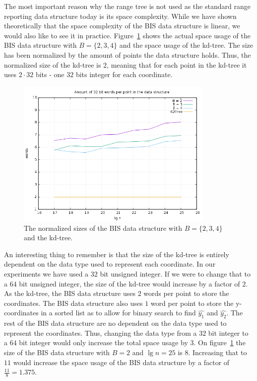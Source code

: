 The most important reason why the range tree is not used as the standard range reporting data structure today is its space complexity. While we have shown theoretically that the space complexity of the BIS data structure is linear, we would also like to see it in practice. Figure~\ref{fig:sizes} shows the actual space usage of the BIS data structure with $B=\{2,3,4\}$ and the space usage of the kd-tree. The size has been normalized by the amount of points the data structure holds. Thus, the normalized size of the kd-tree is $2$, meaning that for each point in the kd-tree it uses $2\cdot 32$ bits - one $32$ bits integer for each coordinate.

\begin{figure}[h]
    \centering
    \includegraphics[width = 0.85\textwidth]{pictures/analysis/sizes.png}
    \caption{The normalized sizes of the BIS data structure with $B=\{2,3,4\}$ and the kd-tree.}\label{fig:sizes}
\end{figure}
\clearpage


An interesting thing to remember is that the size of the kd-tree is entirely dependent on the data type used to represent each coordinate. In our experiments we have used a $32$ bit unsigned integer. If we were to change that to a $64$ bit unsigned integer, the size of the kd-tree would increase by a factor of $2$. As the kd-tree, the BIS data structure uses $2$ words per point to store the coordinates. The BIS data structure also uses $1$ word per point to store the y-coordinates in a sorted list as to allow for binary search to find $\hat{y_1}$ and $\hat{y_2}$. The rest of the BIS data structure are no dependent on the data type used to represent the coordinates. Thus, changing the data type from a $32$ bit integer to a $64$ bit integer would only increase the total space usage by $3$. On figure~\ref{fig:sizes} the size of the BIS data structure with $B=2$ and $\lg n = 25$ is $8$. Increasing that to $11$ would increase the space usage of the BIS data structure by a factor of $\frac{11}{8} = 1.375$.

